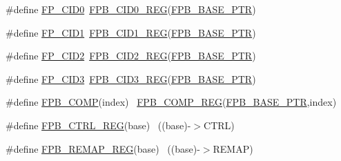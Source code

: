 \begin{DoxyCompactItemize}
\item 
\#define \hyperlink{group___f_p_b___register___accessor___macros_ga52c7dddc23c33f6c4cec456ab5006cfe}{F\+P\+\_\+\+C\+I\+D0}~\hyperlink{group___f_p_b___register___accessor___macros_ga0489173b7028d084cc37f751c01c3a45}{F\+P\+B\+\_\+\+C\+I\+D0\+\_\+\+R\+EG}(\hyperlink{group___f_p_b___peripheral_ga95d994c97f967ce02339465def6bac95}{F\+P\+B\+\_\+\+B\+A\+S\+E\+\_\+\+P\+TR})
\item 
\#define \hyperlink{group___f_p_b___register___accessor___macros_gae72090dc299cc0ce88752ac1aef4a17f}{F\+P\+\_\+\+C\+I\+D1}~\hyperlink{group___f_p_b___register___accessor___macros_ga6fb403a75294c6d76d2bdf8156620f33}{F\+P\+B\+\_\+\+C\+I\+D1\+\_\+\+R\+EG}(\hyperlink{group___f_p_b___peripheral_ga95d994c97f967ce02339465def6bac95}{F\+P\+B\+\_\+\+B\+A\+S\+E\+\_\+\+P\+TR})
\item 
\#define \hyperlink{group___f_p_b___register___accessor___macros_ga8567b72cab0a5adaed761d5b545f678e}{F\+P\+\_\+\+C\+I\+D2}~\hyperlink{group___f_p_b___register___accessor___macros_ga36d0d49963902114ed3fcf12f2a4226a}{F\+P\+B\+\_\+\+C\+I\+D2\+\_\+\+R\+EG}(\hyperlink{group___f_p_b___peripheral_ga95d994c97f967ce02339465def6bac95}{F\+P\+B\+\_\+\+B\+A\+S\+E\+\_\+\+P\+TR})
\item 
\#define \hyperlink{group___f_p_b___register___accessor___macros_gacb056c6cfc1741d7d65a4ceb25b0c9ff}{F\+P\+\_\+\+C\+I\+D3}~\hyperlink{group___f_p_b___register___accessor___macros_ga69bcecf152c05571bbcdb2160cacbd45}{F\+P\+B\+\_\+\+C\+I\+D3\+\_\+\+R\+EG}(\hyperlink{group___f_p_b___peripheral_ga95d994c97f967ce02339465def6bac95}{F\+P\+B\+\_\+\+B\+A\+S\+E\+\_\+\+P\+TR})
\item 
\#define \hyperlink{group___f_p_b___register___accessor___macros_ga790522742b01d47ba97e4977225c8067}{F\+P\+B\+\_\+\+C\+O\+MP}(index)                                                ~\hyperlink{group___f_p_b___register___accessor___macros_ga52fd8faa26cc52d39d15e4897e218bcb}{F\+P\+B\+\_\+\+C\+O\+M\+P\+\_\+\+R\+EG}(\hyperlink{group___f_p_b___peripheral_ga95d994c97f967ce02339465def6bac95}{F\+P\+B\+\_\+\+B\+A\+S\+E\+\_\+\+P\+TR},index)
\item 
\#define \hyperlink{group___f_p_b___register___accessor___macros_ga51c51db7f0fa370f16b973df21399a88}{F\+P\+B\+\_\+\+C\+T\+R\+L\+\_\+\+R\+EG}(base)                                          ~((base)-\/$>$C\+T\+RL)
\item 
\#define \hyperlink{group___f_p_b___register___accessor___macros_gaa4d1a55b94416f3ef869793d4d461e5c}{F\+P\+B\+\_\+\+R\+E\+M\+A\+P\+\_\+\+R\+EG}(base)                                        ~((base)-\/$>$R\+E\+M\+AP)

\end{DoxyCompactItemize}
